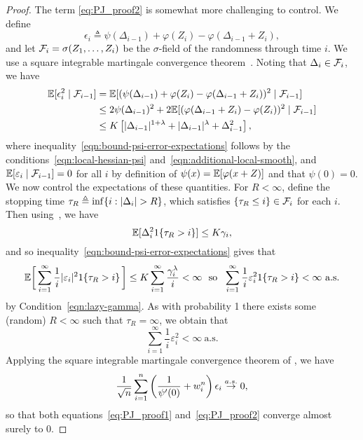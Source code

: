 \begin{proof}
  The term \eqref{eq:PJ_proof2} is somewhat more challenging to control.
  We define
  \begin{equation*}
    \epsilon_i \triangleq \psi(\Delta_{i-1}) + \varphi(Z_i)
    - \varphi(\Delta_{i-1}+Z_i),
  \end{equation*}
  and let
  $\mathcal{F}_i = \sigma(Z_1, \ldots, Z_i)$ be the $\sigma$-field of the randomness
  through time $i$. We use a square integrable martingale convergence
  theorem~\cite[Exercise~5.3.35]{Dembo16}. Noting that
  $\Delta_i \in \mathcal{F}_i$, we have
  \begin{align}
    \mathbb{E}[\epsilon_i^2 \mid \mathcal{F}_{i-1}]
    & = \mathbb{E}[(\psi(\Delta_{i-1}) + \varphi(Z_i)
      - \varphi(\Delta_{i-1} + Z_i))^2 \mid \mathcal{F}_{i-1}]
    \nonumber \\
    & \le 2 \psi(\Delta_{i-1})^2
    + 2 \mathbb{E}[(\varphi(\Delta_{i-1} + Z_i) - \varphi(Z_i))^2 \mid \mathcal{F}_{i-1}]
    \nonumber \\
    & \le
    K \left[|\Delta_{i-1}|^{1 + \lambda}
      + |\Delta_{i-1}|^\lambda
      + \Delta_{i-1}^2 \right],
    \label{eqn:bound-psi-error-expectations}
  \end{align}
  where inequality~\eqref{eqn:bound-psi-error-expectations} follows by the
  conditions~\eqref{eqn:local-hessian-psi}
  and~\eqref{eqn:additional-local-smooth}, and $\mathbb{E}[\varepsilon_i \mid
    \mathcal{F}_{i-1}] = 0$ for all $i$ by definition of $\psi(x) = \mathbb{E}[\varphi(x
    + Z)]$ and that $\psi(0) = 0$.  We now control the expectations of these
  quantities. For $R < \infty$, define the stopping time $\tau_R \triangleq \inf
  \{i : |\Delta_i| > R\}$, which satisfies $\{\tau_R \le i\} \in \mathcal{F}_i$
  for each $i$.  Then using~\cite[Eq.~(A14)]{PolyakJu92}, we have
  \begin{equation*}
    \mathbb{E}[\Delta_i^2 1\!\left\{\tau_R > i\right\}] \le K \gamma_i,
  \end{equation*}
  and so inequality~\eqref{eqn:bound-psi-error-expectations} gives that
  \begin{equation*}
    \mathbb{E}\bigg[\sum_{i = 1}^\infty \frac{1}{i}
      |\varepsilon_i|^2 1\!\left\{\tau_R > i\right\} \bigg]
    \le K \sum_{i = 1}^\infty \frac{\gamma_i^\lambda}{i}
    < \infty
    ~~ \mbox{so} ~~
    \sum_{i = 1}^\infty \frac{1}{i}
    \varepsilon_i^2 1\!\left\{\tau_R > i\right\} < \infty
    ~ \mbox{a.s.}
  \end{equation*}
  by Condition~\eqref{eqn:lazy-gamma}.
  As with probability 1 there exists some (random) $R < \infty$ such that
  $\tau_R = \infty$, we obtain that 
  \begin{equation*}
    \sum_{i = 1}^\infty \frac{1}{i}
    \varepsilon_i^2  < \infty
    ~ \mbox{a.s.}
  \end{equation*}
  Applying the square integrable martingale convergence
  theorem of \cite[Ex.~5.3.35]{Dembo16}, we have
  \begin{equation*}
    \frac{1}{\sqrt{n}} \sum_{i = 1}^n
    \left(\frac{1}{\psi'(0)} + w_i^n\right) \epsilon_i \stackrel{a.s.}{\rightarrow} 0,
  \end{equation*}
  so that both equations~\eqref{eq:PJ_proof1} and~\eqref{eq:PJ_proof2}
  converge almost surely to 0.
\end{proof}

